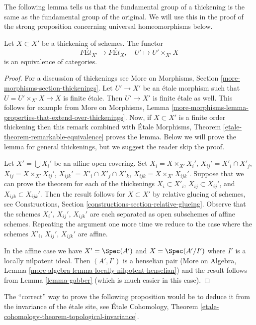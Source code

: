 \noindent
The following lemma tells us that the fundamental group of a thickening
is the same as the fundamental group of the original. We will use this
in the proof of the strong proposition concerning universal homeomorphisms
below.

\begin{lemma}
\label{lemma-thickening}
Let $X \subset X'$ be a thickening of schemes. The functor
$$
\textit{F\'Et}_{X'} \longrightarrow \textit{F\'Et}_X,\quad
U' \longmapsto U' \times_{X'} X
$$
is an equivalence of categories.
\end{lemma}

\begin{proof}
For a discussion of thickenings see
More on Morphisms, Section \ref{more-morphisms-section-thickenings}.
Let $U' \to X'$ be an \'etale morphism such that $U = U' \times_{X'} X \to X$
is finite \'etale. Then $U' \to X'$ is finite \'etale as well.
This follows for example from More on Morphisms, Lemma
\ref{more-morphisms-lemma-properties-that-extend-over-thickenings}.
Now, if $X \subset X'$ is a finite order thickening then this remark
combined with \'Etale Morphisms, Theorem
\ref{etale-theorem-remarkable-equivalence}
proves the lemma. Below we will prove the lemma for general thickenings, but
we suggest the reader skip the proof.

\medskip\noindent
Let $X' = \bigcup X_i'$ be an affine open covering. Set
$X_i = X \times_{X'} X_i'$, $X_{ij}' = X'_i \cap X'_j$,
$X_{ij} = X \times_{X'} X_{ij}'$, $X_{ijk}' = X'_i \cap X'_j \cap X'_k$,
$X_{ijk} = X \times_{X'} X_{ijk}'$.
Suppose that we can prove
the theorem for each of the thickenings
$X_i \subset X'_i$, $X_{ij} \subset X_{ij}'$, and $X_{ijk} \subset X_{ijk}'$.
Then the result follows for $X \subset X'$ by relative glueing of
schemes, see
Constructions, Section \ref{constructions-section-relative-glueing}.
Observe that the schemes $X_i'$, $X_{ij}'$, $X_{ijk}'$ are
each separated as open subschemes of affine schemes. Repeating the
argument one more time we reduce to the case where the schemes
$X'_i$, $X_{ij}'$, $X_{ijk}'$ are affine.

\medskip\noindent
In the affine case we have $X' = \Spec(A')$ and $X = \Spec(A'/I')$
where $I'$ is a locally nilpotent ideal. Then $(A', I')$ is a
henselian pair (More on Algebra, Lemma
\ref{more-algebra-lemma-locally-nilpotent-henselian})
and the result follows from Lemma \ref{lemma-gabber} (which is
much easier in this case).
\end{proof}

\noindent
The ``correct'' way to prove the following proposition would be to
deduce it from the invariance of the \'etale site, see
\'Etale Cohomology, Theorem
\ref{etale-cohomology-theorem-topological-invariance}.

